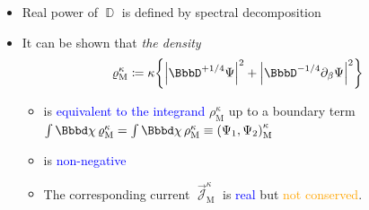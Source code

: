 \documentclass[8pt]{beamer}
\begin{document}
\begin{frame}
\begin{itemize}
\begin{itemize}

\item Real power of $\BbbD$ is defined by spectral decomposition

\item It can be shown that \emph{the density}
\begin{align}
\varrho_\text{M}^\kappa \coloneqq\kappa\cbr{
\vbr{\BbbD^{+1/4}\Psi}^2+\vbr{\BbbD^{-1/4}\partial_\beta{\Psi}}^2}
\end{align}

\begin{itemize}
\item is \textcolor{blue}{equivalent to the integrand} $\rho_\text{M}^\kappa$ 
up to a boundary term
$\int\dd\chi\,\varrho_\text{M}^\kappa = 
\int\dd\chi\,\rho_\text{M}^\kappa \equiv
\rbr{\Psi_1,\Psi_2}_\text{M}^{\kappa}$
\item is \textcolor{blue}{non-negative}
\item The corresponding current $\vec{\mscrJ}_\text{M}^\kappa$
is \textcolor{blue}{real} but
\textcolor{orange}{not conserved}.
\end{itemize}

\end{itemize}

\end{itemize}
\end{frame}

\end{document}
